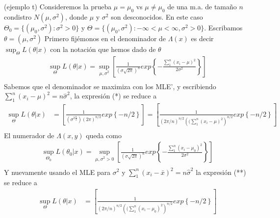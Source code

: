 \documentclass{beamer}
\begin{document}
\begin{frame}{(ejemplo t)}
\tiny{Consideremos la prueba $\mu = \mu_0$ vs $\mu \ne \mu_0$ de una m.a. de tamaño $n$ condistro $N(\mu,\sigma^2)$, donde $\mu$ y $\sigma^2$ son desconocidos. En este caso $\Theta_0 = \{(\mu_0,\sigma^2):\sigma^2>0\}$ y $\Theta =\{(\mu_0,\sigma^2):- \infty < \mu < \infty,\sigma^2>0\}$. Escribamos $\theta=(\mu, \sigma^2)$}
\tiny{Primero fijémonos en el denominador de $\Lambda(x)$ es decir $\sup_\Theta L(\theta | x)$ con la notación que hemos dado de $\theta$}
\begin{equation} \tag{*}
\begin{split}
\sup_\Theta L(\theta | x) = \sup_{\mu, \sigma^2} \left[ \frac{1}{(\sigma\sqrt{2\pi})^n} exp\left\{  -\frac{\sum_1^n(x_i-\mu)^2}{2\sigma^2} \right\}  \right] \\
\end{split}
\end{equation}
\tiny{ Sabemos que el denominador se maximiza con los MLE', y escribiendo $\sum_1^n(x_i-\mu)^2 = n\hat{\sigma}^2$, la expresión (*) se reduce a}   
\begin{equation*}
\begin{split}
\sup_\Theta L(\theta | x) & = \left[ \frac{1}{ (\sigma^{2 \frac{n}{2}} ) (2\pi)^{n/2}} exp \left\{  -n/2 \right\} \right] 
 = \left[ \frac{1}{ (2\pi/n)^{n/2} \left( (\sum_1^n(x_i -\mu)^2\right)^{ n/2} } exp \left\{  -n/2 \right\} \right]\\ \end{split}
\end{equation*}
\tiny{El numerador de $\Lambda(x,y)$ queda como} 
\begin{equation}\tag{**} 
\begin{split} 
\sup_{\Theta_0} L(\theta_0 | x) = \sup_{\mu, \sigma^2>0} \left[ \frac{1}{(\sigma\sqrt{2\pi})^n} exp\left\{  -\frac{\sum_1^n(x_i-\mu_0)^2}{2\sigma^2} \right\}  \right] \\
\end{split}
\end{equation}
\tiny{Y nuevamente usando el MLE para $\sigma^2$ y  $\sum_1^n(x_i-\bar{x})^2 = n\hat{\sigma}^2$ la expresión (**) se reduce a} 
\begin{equation*}
\begin{split}
\sup_\Theta L(\theta | x)
& = \left[ \frac{1}{ (2\pi/n)^{n/2} \left( (\sum_1^n(x_i -\mu_0)^2\right)^{ n/2} } exp \left\{  -n/2 \right\} \right] \\
\\\end{split}
\end{equation*}
\end{frame}
\end{document}
